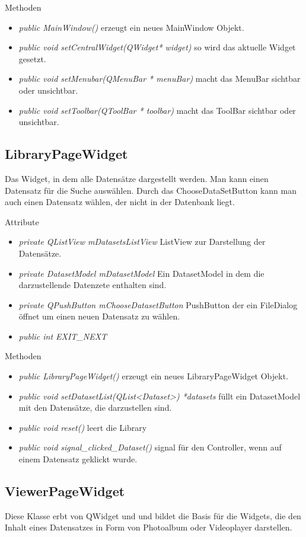 Methoden
\begin{itemize}
	\item\textit{public MainWindow()} erzeugt ein neues MainWindow Objekt.
	\item\textit{public void setCentralWidget(QWidget* widget)} so wird das aktuelle Widget gesetzt.
	\item\textit{public void setMenubar(QMenuBar *  menuBar)} macht das MenuBar sichtbar oder unsichtbar.
	\item\textit{public void setToolbar(QToolBar * toolbar)} macht das ToolBar sichtbar oder unsichtbar.
\end{itemize}

\subsection*{LibraryPageWidget}
Das Widget, in dem alle Datensätze dargestellt werden. Man kann einen Datensatz für die Suche auswählen. Durch das ChooseDataSetButton kann man auch einen Datensatz wählen, der nicht in der Datenbank liegt. 

Attribute
\begin{itemize}
	\item\textit{private QListView mDatasetsListView} ListView zur Darstellung der Datensätze.
	\item\textit{private DatasetModel mDatasetModel}
	Ein DatasetModel in dem die darzustellende Datenzete enthalten sind.
	\item\textit{private QPushButton mChooseDatasetButton} PushButton der ein FileDialog öffnet um einen neuen Datensatz zu wählen.
	\item\textit{public int EXIT\_NEXT}     
\end{itemize}

Methoden
\begin{itemize}
	\item\textit{public LibraryPageWidget()} erzeugt ein neues LibraryPageWidget Objekt.
	\item\textit{public void setDatasetList(QList<Dataset>) *datasets} füllt ein DatasetModel mit den Datensätze, die darzustellen sind.
	\item\textit{public void reset()}
	leert die Library 
	\item\textit{public void signal\_clicked\_Dataset()} signal für den Controller, wenn auf einem Datensatz geklickt wurde.
\end{itemize}

\subsection*{ViewerPageWidget}
Diese Klasse erbt von QWidget und und bildet die Basis für die Widgets, die den Inhalt eines Datensatzes in Form von Photoalbum oder Videoplayer darstellen.


